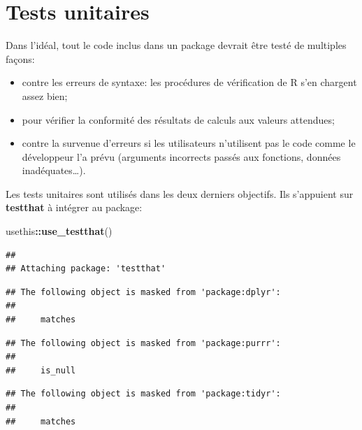 \documentclass[
  12pt,
  french,
  a4paper,
  extrafontsizes,onecolumn,openright
  ]{memoir}
\newenvironment{Shaded}{\begin{snugshade}}{\end{snugshade}}
\newcommand{\KeywordTok}[1]{\textcolor[rgb]{0.13,0.29,0.53}{\textbf{#1}}}
\newcommand{\NormalTok}[1]{#1}
\newcommand{\OperatorTok}[1]{\textcolor[rgb]{0.81,0.36,0.00}{\textbf{#1}}}
\providecommand{\tightlist}{%
  \setlength{\itemsep}{0pt}\setlength{\parskip}{0pt}}
\begin{document}
\hypertarget{tests-unitaires}{%
\section{Tests unitaires}\label{tests-unitaires}}

Dans l'idéal, tout le code inclus dans un package devrait être testé de multiples façons:

\begin{itemize}
\tightlist
\item
  contre les erreurs de syntaxe: les procédures de vérification de R s'en chargent assez bien;
\item
  pour vérifier la conformité des résultats de calculs aux valeurs attendues;
\item
  contre la survenue d'erreurs si les utilisateurs n'utilisent pas le code comme le développeur l'a prévu (arguments incorrects passés aux fonctions, données inadéquates\ldots).
\end{itemize}

Les tests unitaires sont utilisés dans les deux derniers objectifs.
Ils s'appuient sur \textbf{testthat} à intégrer au package:

\scriptsize

\begin{Shaded}
\begin{Highlighting}[]
\NormalTok{usethis}\OperatorTok{::}\KeywordTok{use_testthat}\NormalTok{()}
\end{Highlighting}
\end{Shaded}

\normalsize

\scriptsize

\begin{verbatim}
## 
## Attaching package: 'testthat'
\end{verbatim}

\begin{verbatim}
## The following object is masked from 'package:dplyr':
## 
##     matches
\end{verbatim}

\begin{verbatim}
## The following object is masked from 'package:purrr':
## 
##     is_null
\end{verbatim}

\begin{verbatim}
## The following object is masked from 'package:tidyr':
## 
##     matches
\end{verbatim}
\end{document}
